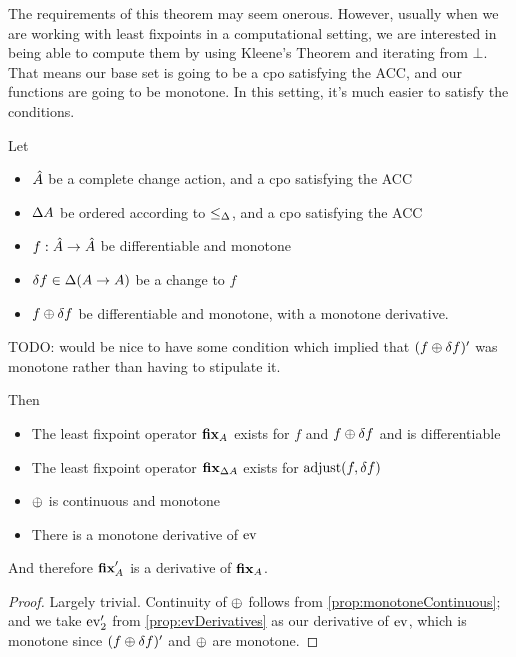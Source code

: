 The requirements of this theorem may seem onerous. However, usually when we are
working with least fixpoints in a computational setting, we are interested in
being able to compute them by using Kleene's Theorem and iterating from $\bot$.
That means our base set is going to be a cpo satisfying the ACC, and our
functions are going to be monotone. In this setting, it's much easier to satisfy
the conditions.

\begin{prop}
  Let
  \begin{itemize}
    \item $\hat{A}$ be a complete change action, and a cpo satisfying the ACC
    \item $\Delta A$ be ordered according to $\leq_\Delta$, and a cpo
      satisfying the ACC
    \item $f: \hat{A} \rightarrow \hat{A}$ be differentiable and monotone
    \item $\delta f \in \Delta (A \rightarrow A)$ be a change to $f$
    \item$f \oplus \delta f$ be differentiable and monotone, with a monotone derivative.
  \end{itemize}

  TODO: would be nice to have some condition which implied that $(f
    \oplus \delta f)'$ was monotone rather than having to stipulate it.

  Then
  \begin{itemize}
    \item The least fixpoint operator $\textbf{fix}_A$ exists for $f$ and $f \oplus
      \delta f$ and is differentiable
    \item The least fixpoint operator $\textbf{fix}_{\Delta A}$ exists for
      $\operatorname{adjust}(f, \delta f)$
    \item $\oplus$ is continuous and monotone
    \item There is a monotone derivative of $\operatorname{ev}$
  \end{itemize}

  And therefore $\textbf{fix}_A'$ is a derivative of $\textbf{fix}_A$.
\end{prop}
\ifproofs
\begin{proof}
  Largely trivial. Continuity of $\oplus$ follows from
  \cref{prop:monotoneContinuous}; and we take $\operatorname{ev}'_2$ from
  \cref{prop:evDerivatives} as our derivative of $\operatorname{ev}$, which is monotone 
  since $(f \oplus \delta f)'$ and $\oplus$ are monotone.
\end{proof}
\fi

